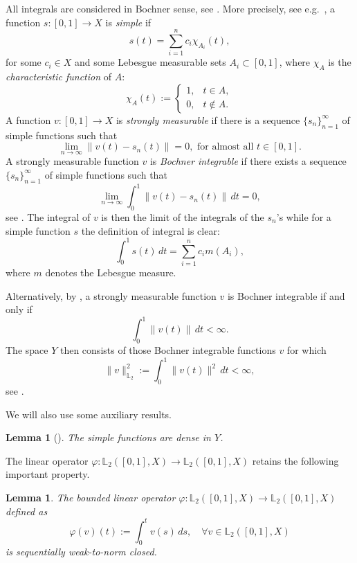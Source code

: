 \documentclass[12pt,leqno]{article}
\newtheorem{lem}[thm]{Lemma}          %
\theoremstyle{definition}
\theoremstyle{remark}
\def\L{\mathbb{L}}
\begin{document}
All integrals are considered in Bochner sense, see \cite[Chapter~II]{diestel_uhl_vector}.
More precisely, see e.g.~\cite[p.~8]{hytonen_analysis_banach}, a function $s:[0,1]\to X$ is \textit{simple} if
$$
    s(t) = \sum_{i=1}^n c_i \chi_{A_i}(t),
$$
for some $c_i\in X$ and some Lebesgue measurable sets $A_i\subset[0,1]$, where $\chi_A$ is the \textit{characteristic function} of $A$:
$$
    \chi_A(t) := \begin{cases} 1, & t\in A,\\ 0, & t\notin A. \end{cases}
$$
A function $v:[0,1]\to X$ is \textit{strongly measurable} if there is a sequence $\{s_n\}_{n=1}^\infty$ of simple functions such that
$$
   \lim_{n\to\infty}\|v(t) - s_n(t)\| = 0,\text{ for almost all }t\in[0,1].
$$
A strongly measurable function $v$ is \emph{Bochner integrable} if there exists a sequence $\{s_n\}_{n=1}^\infty$ of simple functions such that
$$
    \lim_{n\to\infty}\int_0^1 \|v(t) - s_n(t)\|\, dt =0,
$$
see \cite[Definition~1.2.1]{hytonen_analysis_banach}. The integral of $v$ is then the limit of the integrals of the $s_n$'s while for a simple function $s$ the definition of integral is clear:
$$
    \int_0^1s(t)\, dt = \sum_{i=1}^n c_i m(A_i),
$$
where $m$ denotes the Lebesgue measure.

Alternatively, by \cite[Proposition~1.2.2]{hytonen_analysis_banach}, a strongly measurable function $v$ is Bochner integrable if and only if
$$
    \int_0^1\|v(t)\|\, dt < \infty.
$$
 The space $Y$ then consists of those Bochner integrable functions $v$ for which
$$
    \|v\|_{\L_2}^2 := \int_0^1\|v(t)\|^2\, dt < \infty,
$$
see \cite[Definition~1.2.15]{hytonen_analysis_banach}.

\medskip

We will also use some auxiliary results.
\begin{lem}[{\cite[Lemma~1.2.19]{hytonen_analysis_banach}}]
    \label{lem:simple-dense}
    The simple functions are dense in $Y$.
\end{lem}

The  linear operator $\varphi:\L_2([0,1],X)\to \L_2([0,1],X)$
retains the following important property.
\begin{lem}
    \label{lem:fi-w-to-norm-closed}
    The bounded linear operator $
        \varphi: \L_2([0,1], X) \to \L_2([0,1], X)$ defined as
\begin{equation}\label{def:phi}
  \varphi (v)(t):=\int_0^t v(s) \, ds,\quad \forall v\in  \L_2([0,1],X)
\end{equation}
    is sequentially weak-to-norm closed.
\end{lem}
\end{document}
